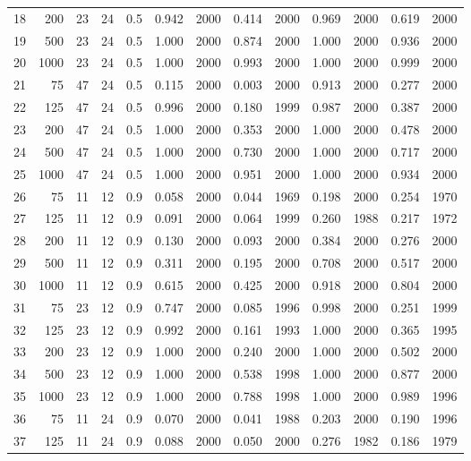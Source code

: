 \documentclass{article}
\begin{document}
\begin{table}[ht]
\begin{center}
\begin{tabular}{rrrrrrrrrrrrr}
  18 & 200 & 23 & 24 & 0.5 & 0.942 & 2000 & 0.414 & 2000 & 0.969 & 2000 & 0.619 & 2000 \\ 
  19 & 500 & 23 & 24 & 0.5 & 1.000 & 2000 & 0.874 & 2000 & 1.000 & 2000 & 0.936 & 2000 \\ 
  20 & 1000 & 23 & 24 & 0.5 & 1.000 & 2000 & 0.993 & 2000 & 1.000 & 2000 & 0.999 & 2000 \\ 
   \hline
21 & 75 & 47 & 24 & 0.5 & 0.115 & 2000 & 0.003 & 2000 & 0.913 & 2000 & 0.277 & 2000 \\ 
  22 & 125 & 47 & 24 & 0.5 & 0.996 & 2000 & 0.180 & 1999 & 0.987 & 2000 & 0.387 & 2000 \\ 
  23 & 200 & 47 & 24 & 0.5 & 1.000 & 2000 & 0.353 & 2000 & 1.000 & 2000 & 0.478 & 2000 \\ 
  24 & 500 & 47 & 24 & 0.5 & 1.000 & 2000 & 0.730 & 2000 & 1.000 & 2000 & 0.717 & 2000 \\ 
  25 & 1000 & 47 & 24 & 0.5 & 1.000 & 2000 & 0.951 & 2000 & 1.000 & 2000 & 0.934 & 2000 \\ 
   \hline
26 & 75 & 11 & 12 & 0.9 & 0.058 & 2000 & 0.044 & 1969 & 0.198 & 2000 & 0.254 & 1970 \\ 
  27 & 125 & 11 & 12 & 0.9 & 0.091 & 2000 & 0.064 & 1999 & 0.260 & 1988 & 0.217 & 1972 \\ 
  28 & 200 & 11 & 12 & 0.9 & 0.130 & 2000 & 0.093 & 2000 & 0.384 & 2000 & 0.276 & 2000 \\ 
  29 & 500 & 11 & 12 & 0.9 & 0.311 & 2000 & 0.195 & 2000 & 0.708 & 2000 & 0.517 & 2000 \\ 
  30 & 1000 & 11 & 12 & 0.9 & 0.615 & 2000 & 0.425 & 2000 & 0.918 & 2000 & 0.804 & 2000 \\ 
   \hline
31 & 75 & 23 & 12 & 0.9 & 0.747 & 2000 & 0.085 & 1996 & 0.998 & 2000 & 0.251 & 1999 \\ 
  32 & 125 & 23 & 12 & 0.9 & 0.992 & 2000 & 0.161 & 1993 & 1.000 & 2000 & 0.365 & 1995 \\ 
  33 & 200 & 23 & 12 & 0.9 & 1.000 & 2000 & 0.240 & 2000 & 1.000 & 2000 & 0.502 & 2000 \\ 
  34 & 500 & 23 & 12 & 0.9 & 1.000 & 2000 & 0.538 & 1998 & 1.000 & 2000 & 0.877 & 2000 \\ 
  35 & 1000 & 23 & 12 & 0.9 & 1.000 & 2000 & 0.788 & 1998 & 1.000 & 2000 & 0.989 & 1996 \\ 
   \hline
36 & 75 & 11 & 24 & 0.9 & 0.070 & 2000 & 0.041 & 1988 & 0.203 & 2000 & 0.190 & 1996 \\ 
  37 & 125 & 11 & 24 & 0.9 & 0.088 & 2000 & 0.050 & 2000 & 0.276 & 1982 & 0.186 & 1979 \\ 

\end{tabular}
\end{center}
\end{table}
\end{document}
